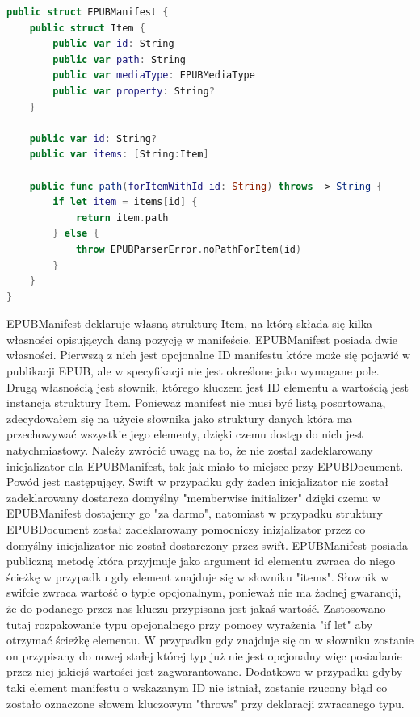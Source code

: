 \begin{lstlisting}[caption={Struktura EPUBManifest.}, language=swift]
public struct EPUBManifest {
    public struct Item {
        public var id: String
        public var path: String
        public var mediaType: EPUBMediaType
        public var property: String?
    }

    public var id: String?
    public var items: [String:Item]

    public func path(forItemWithId id: String) throws -> String {
        if let item = items[id] {
            return item.path
        } else {
            throw EPUBParserError.noPathForItem(id)
        }
    }
}
\end{lstlisting}

EPUBManifest deklaruje własną strukturę Item, na którą składa się kilka własności opisujących daną pozycję w manifeście. EPUBManifest posiada dwie własności. Pierwszą z nich jest opcjonalne ID manifestu które może się pojawić w publikacji EPUB, ale w specyfikacji nie jest określone jako wymagane pole. Drugą własnością jest słownik, którego kluczem jest ID elementu a wartością jest instancja struktury Item. Ponieważ manifest nie musi być listą posortowaną, zdecydowałem się na użycie słownika jako struktury danych która ma przechowywać wszystkie jego elementy, dzięki czemu dostęp do nich jest natychmiastowy. Należy zwrócić uwagę na to, że nie został zadeklarowany inicjalizator dla EPUBManifest, tak jak miało to miejsce przy EPUBDocument. Powód jest następujący, Swift w przypadku gdy żaden inicjalizator nie został zadeklarowany dostarcza domyślny "memberwise initializer" dzięki czemu w EPUBManifest dostajemy go "za darmo", natomiast w przypadku struktury EPUBDocument został zadeklarowany pomocniczy inizjalizator przez co domyślny inicjalizator nie został dostarczony przez swift. EPUBManifest posiada publiczną metodę która przyjmuje jako argument id elementu zwraca do niego ścieżkę w przypadku gdy element znajduje się w słowniku "items". Słownik w swifcie zwraca wartość o typie opcjonalnym, ponieważ nie ma żadnej gwarancji, że do podanego przez nas kluczu przypisana jest jakaś wartość. Zastosowano tutaj rozpakowanie typu opcjonalnego przy pomocy wyrażenia "if let" aby otrzymać ścieżkę elementu. W przypadku gdy znajduje się on w słowniku zostanie on przypisany do nowej stałej której typ już nie jest opcjonalny więc posiadanie przez niej jakiejś wartości jest zagwarantowane. Dodatkowo w przypadku gdyby taki element manifestu o wskazanym ID nie istniał, zostanie rzucony błąd co zostało oznaczone słowem kluczowym "throws" przy deklaracji zwracanego typu.

